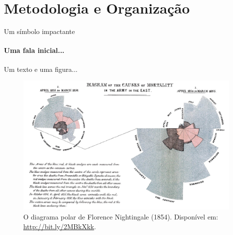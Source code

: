 \documentclass[aspectratio=169]{beamer}
\begin{document}
\section{Metodologia e Organização}
\begin{frame}{Um símbolo impactante}
\framesubtitle{Uma fala inicial...}
Um texto e uma figura...
\begin{figure}
	\includegraphics[scale=0.6]{figuras/rose-diagram.png}
	\caption{O diagrama polar de Florence Nightingale (1854). Disponível em: \url{http://bit.ly/2MBkXkk}.}
\end{figure}
\end{frame}
\end{document}
